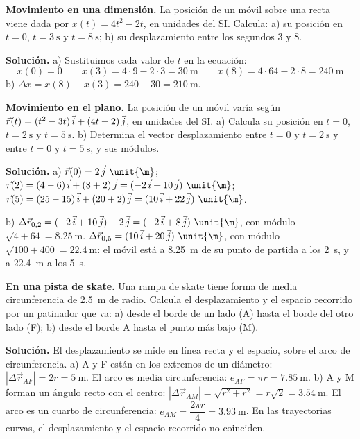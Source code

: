 \begin{example}
    \textbf{Movimiento en una dimensión.} La posición de un móvil sobre una recta viene dada por \(x(t) = 4t^2 - 2t\), en unidades
    del SI. Calcula: a) su posición en \(t = 0\), \(t = \qty{3}{\s}\) y \(t = \qty{8}{\s}\); b) su desplazamiento entre los
    segundos 3 y 8.

    \textbf{Solución.} a) Sustituimos cada valor de \(t\) en la ecuación:
    \[ x(0) = 0 \qquad x(3) = 4 \cdot 9 - 2 \cdot 3 = \qty{30}{\m} \qquad x(8) = 4 \cdot 64 - 2 \cdot 8 = \qty{240}{\m} \]
    b) \(\Delta x = x(8) - x(3) = 240 - 30 = \qty{210}{\m}\).
\end{example}

\begin{example}
    \textbf{Movimiento en el plano.} La posición de un móvil varía según \(\vec r(t) = (t^2 - 3t)\,\vec{i} + (4t + 2)\,\vec{j}\), en
    unidades del SI. a) Calcula su posición en \(t = 0\), \(t = \qty{2}{\s}\) y \(t = \qty{5}{\s}\). b) Determina el vector
    desplazamiento entre \(t = 0\) y \(t = \qty{2}{\s}\) y entre \(t = 0\) y \(t = \qty{5}{\s}\), y sus módulos.

    \textbf{Solución.} a) \(\vec r(0) = 2\,\jvec~\unit{\m}\); \(\vec r(2) = (4 - 6)\,\ivec + (8 + 2)\,\jvec = (-2\,\ivec + 10\,\jvec)~\unit{\m}\);
    \(\vec r(5) = (25 - 15)\,\ivec + (20 + 2)\,\jvec = (10\,\ivec + 22\,\jvec)~\unit{\m}\).

    b) \(\Delta\vec r_{0,2} = (-2\,\ivec + 10\,\jvec) - 2\,\jvec = (-2\,\ivec + 8\,\jvec)~\unit{\m}\), con módulo
    \(\sqrt{4 + 64} = \qty{8.25}{\m}\). \(\Delta\vec r_{0,5} = (10\,\ivec + 20\,\jvec)~\unit{\m}\), con módulo
    \(\sqrt{100 + 400} = \qty{22.4}{\m}\): el móvil está a \qty{8.25}{\m} de su punto de partida a los \qty{2}{\s}, y a
    \qty{22.4}{\m} a los \qty{5}{\s}.
\end{example}

\begin{example}
    \textbf{En una pista de skate.} Una rampa de skate tiene forma de media circunferencia de \qty{2.5}{\m} de radio. Calcula el
    desplazamiento y el espacio recorrido por un patinador que va: a) desde el borde de un lado (A) hasta el borde del otro lado
    (F); b) desde el borde A hasta el punto más bajo (M).

    \textbf{Solución.} El desplazamiento se mide en línea recta y el espacio, sobre el arco de circunferencia.
    a) A y F están en los extremos de un diámetro: \(|\Delta\vec r_{AF}| = 2r = \qty{5}{\m}\). El arco es media circunferencia:
    \(e_{AF} = \pi r = \qty{7.85}{\m}\).
    b) A y M forman un ángulo recto con el centro: \(|\Delta\vec r_{AM}| = \sqrt{r^2 + r^2} = r\sqrt 2 = \qty{3.54}{\m}\). El arco es
    un cuarto de circunferencia: \(e_{AM} = \dfrac{2\pi r}{4} = \qty{3.93}{\m}\). En las trayectorias curvas, el desplazamiento y
    el espacio recorrido no coinciden.
\end{example}

